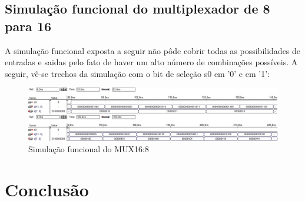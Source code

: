 \documentclass[a4paper]{article}
\begin{document}
\FloatBarrier

\subsection{Simulação funcional do multiplexador de 8 para 16}

	A simulação funcional exposta a seguir não pôde cobrir todas as possibilidades de entradas e saidas pelo fato de haver um alto número de combinações possíveis. A seguir, vê-se trechos da simulação com o bit de seleção s0 em '0' e em '1':
\begin{figure}[h]
  \centering
  \includegraphics[scale=0.45]{mux_16-8_simulacao1.jpg}
  \caption{Simulação funcional do MUX16:8}
\end{figure}



\FloatBarrier

\section{Conclusão}
\end{document}
